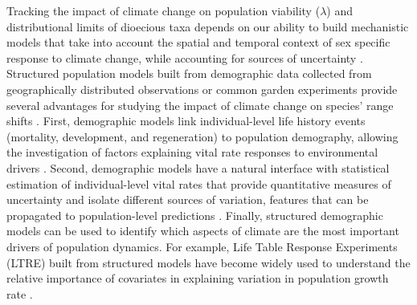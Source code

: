 \documentclass[9pt,twocolumn,twoside,lineno]{pnas-new}
\newcommand{\jacob}[2]{{\color{blue}{#1}}\footnote{\textit{\color{blue}{#2}}}}
\begin{document}
Tracking the impact of climate change on  population viability ($\lambda$) and distributional limits of dioecious taxa depends on our ability to build mechanistic models that take into account the spatial and temporal context of sex specific response to climate change, while accounting for sources of uncertainty \citep{davis2001range,evans2016towards}.
Structured population models built from demographic data collected from geographically distributed observations or common garden experiments provide several advantages for studying the impact of climate change on species' range shifts \citep{merow2017climate,schwinning2022common,schultz2022climate}.
First, demographic models link individual-level life history events (mortality, development, and regeneration) to population demography, allowing the investigation of factors explaining vital rate responses to environmental drivers \citep{ehrlen2015predicting,louthan2022climate,dahlgren2016demography}. 
Second, demographic models have a natural interface with %
statistical estimation of individual-level vital rates that provide quantitative measures of uncertainty and isolate different sources of variation, features that can be propagated to population-level predictions \citep{elderd2016quantifying,ellner2022critical}.
Finally, structured demographic models can be used to identify which aspects of climate are the most important drivers of population dynamics.
For example, Life Table Response Experiments (LTRE) built from structured models have become widely used to understand the relative importance of covariates in explaining variation in population growth rate  \citep{ellner2016data,hernandez2023exact,czachura2020demographic}.
\end{document}

